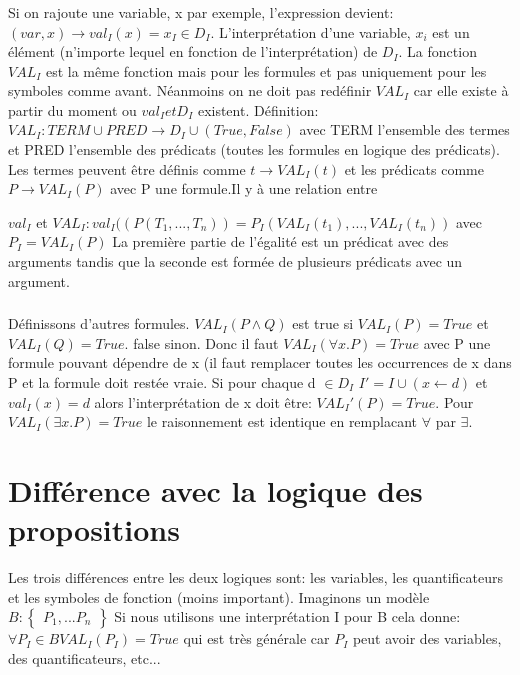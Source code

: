 \subsubsection{}
Si on rajoute une variable, x par exemple, l'expression devient: $ (var, x) \rightarrow val_{I}(x) = x_{I} \in D_{I}$. L'interprétation d'une variable, $x_{i}$ est un élément (n'importe lequel en fonction de l'interprétation) de $D_{I}$. La fonction $VAL_{I}$ est la même fonction mais pour les formules et pas uniquement pour les symboles comme avant. Néanmoins on ne doit pas redéfinir $VAL_{I}$ car elle existe à partir du moment ou $val_{I} et D_{I}$ existent. Définition: $VAL_{I}: TERM \cup  PRED \rightarrow D_{I} \cup (True, False) $ avec TERM l'ensemble des termes et PRED l'ensemble des
prédicats (toutes les formules en logique des prédicats). Les termes peuvent être définis comme $ t \rightarrow VAL_{I}(t)$ et les prédicats comme $ P \rightarrow VAL_{I}(P)$ avec P une formule.Il y à une relation entre 

$val_{I} $ et $ VAL_{I}: val_{I}((P(T_{1},...,T_{n})) = P_{I}(VAL_{I}(t_{1}),...,VAL_{I}(t_{n}))$ avec $ P_{I} = VAL_{I}(P)$ 
La première partie de l'égalité est un prédicat avec des arguments tandis que la seconde est formée de plusieurs prédicats avec un argument. 
\subsubsection{}
Définissons d'autres formules. $VAL_{I}(P \wedge Q) $ est true si $VAL_{I}(P) = True$ et $VAL_{I}(Q) = True$. false sinon. Donc il faut $VAL_{I}(\forall x.P) = True$ avec P une formule pouvant dépendre de x (il faut remplacer toutes les occurrences de x dans P et la formule doit restée vraie. Si pour chaque d $\in D_{I}$ $ I' = I \cup (x \leftarrow d)$ et $val_{I}(x) = d$ alors l'interprétation de x doit être: $VAL_{I}'(P) = True$.
Pour $VAL_{I}(\exists x.P) = True$ le raisonnement est identique en remplacant $\forall$ par $\exists$.
\section{Différence avec la logique des propositions}
Les trois différences entre les deux logiques sont: les variables, les quantificateurs et les symboles de fonction (moins important). Imaginons un modèle $B: 
\left\{
  \begin{array}{rcr}
    P_{1},...P_{n}
  \end{array}
\right\}
$
Si nous utilisons une interprétation I pour B cela donne:
$\forall P_{I} \in B VAL_{I}(P_{I}) = True$ qui est très générale car $P_{I}$ peut avoir des variables, des quantificateurs, etc...

